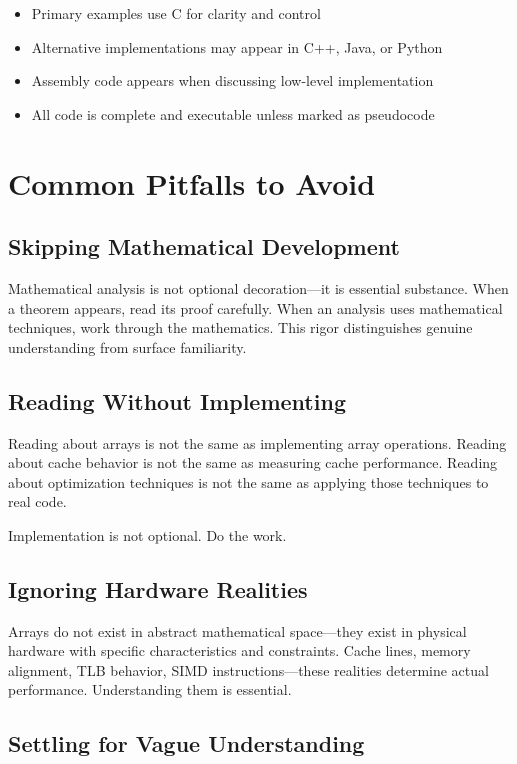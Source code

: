 \begin{itemize}
    \item Primary examples use C for clarity and control
    \item Alternative implementations may appear in C++, Java, or Python
    \item Assembly code appears when discussing low-level implementation
    \item All code is complete and executable unless marked as pseudocode
\end{itemize}

\section*{Common Pitfalls to Avoid}

\subsection*{Skipping Mathematical Development}

Mathematical analysis is not optional decoration—it is essential substance. When a theorem appears, read its proof carefully. When an analysis uses mathematical techniques, work through the mathematics. This rigor distinguishes genuine understanding from surface familiarity.

\subsection*{Reading Without Implementing}

Reading about arrays is not the same as implementing array operations. Reading about cache behavior is not the same as measuring cache performance. Reading about optimization techniques is not the same as applying those techniques to real code.

Implementation is not optional. Do the work.

\subsection*{Ignoring Hardware Realities}

Arrays do not exist in abstract mathematical space—they exist in physical hardware with specific characteristics and constraints. Cache lines, memory alignment, TLB behavior, SIMD instructions—these realities determine actual performance. Understanding them is essential.

\subsection*{Settling for Vague Understanding}

